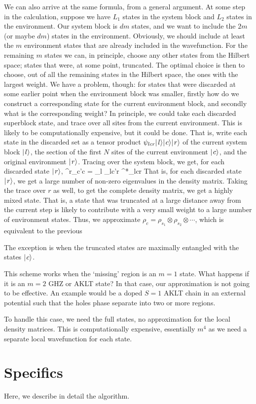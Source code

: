 \documentclass{article}[10pt]
\begin{document}
We can also arrive at the same formula, from a general argument. At some step in the calculation,
suppose we have $L_1$ states in the system block and $L_2$ states in the environment.
Our system block is $dm$ states, and we want to include the $2m$ (or maybe $dm$) states
in the environment. Obviously, we should include at least the $m$ environment states that
are already included in the wavefunction. For the remaining $m$ states we can, in principle,
choose any other states from the Hilbert space; states that were, at some point, truncated.
The optimal choice is then to choose, out of all the remaining states in the Hilbert space,
the ones with the largest weight. We have a problem, though: for states that were discarded
at some earlier point when the environment block was smaller, firstly how do we construct
a corresponding state for the current environment block, and secondly what is the corresponding
weight? In principle, we could take each discarded superblock state, and trace over all sites
from the current environment. This is likely to be computationally expensive, but it could be done.
That is, write each state in the discarded set as a tensor product 
$\psi_{lcr} \hbox{$\mid \! {l} \rangle$}\hbox{$\mid \! {c} \rangle$}\hbox{$\mid \! {r} \rangle$}$ of
the current system block $\hbox{$\mid \! {l} \rangle$}$, the section of the first $N$ sites of the current environment
$\hbox{$\mid \! {c} \rangle$}$, and the original environment $\hbox{$\mid \! {r} \rangle$}$. Tracing over the system block, we get,
for each discarded state $\hbox{$\mid \! {r} \rangle$}$,
\beq
\rho^r_{c'c} = \sum_l \psi_{lc'r} \psi^*_{lcr}
\eeq
That is, for each discarded state $\hbox{$\mid \! {r} \rangle$}$, we get a large number of non-zero eigenvalues
in the density matrix. Taking the trace over $r$ as well, to get the complete density matrix,
we get a highly mixed state. That is, a state that was truncated at a large distance away
from the current step is likely to contribute with a very small weight to a large number of 
environment states. Thus, we approximate $\rho_c = \rho_{s_1} \otimes \rho_{s_2} \otimes \cdots$,
which is equivalent to the previous 

The exception is when the truncated states are maximally entangled with
the states $\hbox{$\mid \! {c} \rangle$}$. 

This scheme works when the `missing' region is an $m=1$ state.  What happens if it is an $m=2$
GHZ or AKLT state? In that case, our approximation is not going to be effective.
An example would be a doped $S=1$ AKLT chain in an external potential such that the holes
phase separate into two or more regions. 

To handle this case, we need the full states, no approximation for the
local density matrices. This is computationally
expensive, essentially $m^4$ as we need a separate local wavefunction for each state.

\section{Specifics}

Here, we describe in detail the algorithm.
\end{document}
